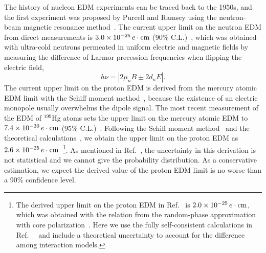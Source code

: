 \documentclass[aps,prd,twocolumn,groupedaddress,showpacs,superscriptaddress,floatfix,nofootinbib,10pt]{revtex4-1}
\begin{document}
The history of nucleon EDM experiments can be traced back to the 1950s, and the first experiment was proposed by Purcell and Ramsey  using the neutron-beam magnetic resonance method~\cite{Purcell:1950zz,Smith:1957ht}. The current upper limit on the neutron EDM from direct measurements is $3.0\times10^{-26}\,e\cdot{\rm cm}$ (90\% C.L.)~\cite{Afach:2015sja}, which was obtained with ultra-cold neutrons permeated in uniform electric and magnetic fields by measuring the difference of Larmor precession frequencies when flipping the electric field,
\begin{equation}
h\nu=|2\mu_nB \pm 2d_nE|.
\end{equation}
The current upper limit on the proton EDM is derived from the mercury atomic EDM limit with the Schiff moment method~\cite{Dmitriev:2003sc}, because the existence of an electric monopole usually overwhelms the dipole signal. The most recent measurement of the EDM of $^{199}$Hg atoms sets the upper limit on the mercury atomic EDM to $7.4\times10^{-30}\,e\cdot{\rm cm}$ (95\% C.L.)~\cite{Graner:2016ses}. Following the Schiff moment method~\cite{Dmitriev:2003sc} and the theoretical calculations~\cite{Ban:2010ea}, we obtain the upper limit on the proton EDM as $2.6\times10^{-25}\,e\cdot{\rm cm}$~\footnote{The derived upper limit on the proton EDM in Ref.~\cite{Graner:2016ses} is $2.0\times10^{-25}\,e\cdot{\rm cm}$, which was obtained with the relation from the random-phase approximation with core polarization~\cite{Dmitriev:2003sc}. Here we use the fully self-consistent calculations in Ref.~~\cite{Ban:2010ea} and include a theoretical uncertainty to account for the difference among interaction models.}. As mentioned in Ref.~\cite{Dmitriev:2003sc}, the uncertainty in this derivation is not statistical and we cannot give the probability distribution. As a conservative estimation, we expect the derived value of the proton EDM limit is no worse than a 90\% confidence level.
\end{document}
